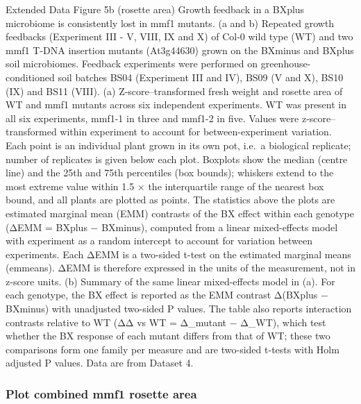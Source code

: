 \documentclass[
  10pt,
]{article}
\begin{document}
Extended Data Figure 5b (rosette area) \textbar{} Growth feedback in a
BXplus microbiome is consistently lost in mmf1 mutants. (a and b)
Repeated growth feedbacks (Experiment III - V, VIII, IX and X) of Col-0
wild type (WT) and two mmf1 T-DNA insertion mutants (At3g44630) grown on
the BXminus and BXplus soil microbiomes. Feedback experiments were
performed on greenhouse-conditioned soil batches BS04 (Experiment III
and IV), BS09 (V and X), BS10 (IX) and BS11 (VIII). (a)
Z-score--transformed fresh weight and rosette area of WT and mmf1
mutants across six independent experiments. WT was present in all six
experiments, mmf1-1 in three and mmf1-2 in five. Values were
z-score--transformed within experiment to account for between-experiment
variation. Each point is an individual plant grown in its own pot,
i.e.~a biological replicate; number of replicates is given below each
plot. Boxplots show the median (centre line) and the 25th and 75th
percentiles (box bounds); whiskers extend to the most extreme value
within 1.5 × the interquartile range of the nearest box bound, and all
plants are plotted as points. The statistics above the plots are
estimated marginal mean (EMM) contrasts of the BX effect within each
genotype (ΔEMM = BXplus − BXminus), computed from a linear mixed-effects
model with experiment as a random intercept to account for variation
between experiments. Each ΔEMM is a two-sided t-test on the estimated
marginal means (emmeans). ΔEMM is therefore expressed in the units of
the measurement, not in z-score units. (b) Summary of the same linear
mixed-effects model in (a). For each genotype, the BX effect is reported
as the EMM contrast Δ(BXplus − BXminus) with unadjusted two-sided P
values. The table also reports interaction contrasts relative to WT (ΔΔ
vs WT = Δ\_mutant − Δ\_WT), which test whether the BX response of each
mutant differs from that of WT; these two comparisons form one family
per measure and are two-sided t-tests with Holm adjusted P values. Data
are from Dataset 4.

\subsubsection{}\label{section}

\subsubsection{Plot combined mmf1 rosette
area}\label{plot-combined-mmf1-rosette-area}
\end{document}
